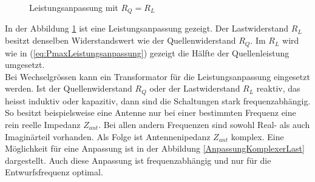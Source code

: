 \begin{figure}[!ht]
	\begin{center}
	\end{center}
\caption{Leistungsanpassung mit $R_Q = R_L$}
\label{fig:LeistungsanpassungU0_RQ_RL}
\end{figure}
In der Abbildung \ref{fig:LeistungsanpassungU0_RQ_RL} ist eine Leistungsanpassung gezeigt. 
Der Lastwiderstand $R_{L}$ besitzt denselben Widerstandswert wie der Quellenwiderstand $R_{Q}$. Im $R_{L}$ wird wie in (\ref{eq:PmaxLeistungsanpassung}) gezeigt die Hälfte der Quellenleistung umgesetzt.\\
Bei Wechselgrössen kann ein Transformator für die Leistungsanpassung eingesetzt werden. Ist der Quellenwiderstand $R_Q$ oder der Lastwiderstand $R_L$ reaktiv, das heisst induktiv oder kapazitiv, dann sind die Schaltungen stark frequenzabhängig. So besitzt beispielsweise eine Antenne nur bei einer bestimmten Frequenz eine rein reelle Impedanz $Z_{ant}$. Bei allen andern Frequenzen sind sowohl Real- als auch Imaginärteil vorhanden. Als Folge ist Antennenipedanz $Z_{ant}$ komplex. Eine Möglichkeit für eine Anpassung ist in der Abbildung \ref{AnpassungKomplexerLast} dargestellt. Auch diese Anpassung ist frequenzabhängig und nur für die Entwurfsfrequenz optimal.
